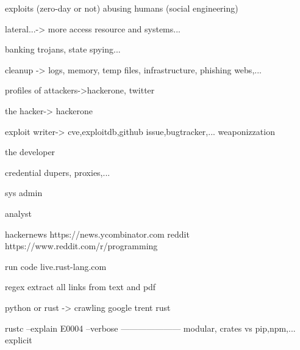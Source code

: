 \documentclass{book}
\begin{document}
exploits (zero-day or not)
abusing humans (social engineering)
  			
lateral...-> more access resource and systems...

banking trojans, state spying...

cleanup -> logs, memory, temp files, infrastructure, phishing webs,...

profiles of attackers->hackerone, twitter

the hacker-> hackerone  					

exploit writer-> cve,exploitdb,github issue,bugtracker,...
weaponizzation

the developer

credential dupers, proxies,...

sys admin

analyst

hackernews https://news.ycombinator.com
reddit https://www.reddit.com/r/programming

run code live.rust-lang.com
  						


regex
extract all links from text and pdf

python or rust -> crawling google trent rust

rustc --explain E0004
--verbose
---------------------
%	
modular, crates vs pip,npm,...
explicit
\end{document}
